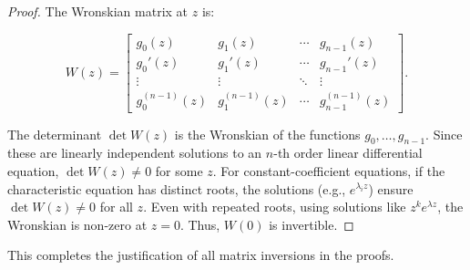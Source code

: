 \documentclass{article}
\begin{document}
	\begin{proof}
		The Wronskian matrix at \(z\) is:
		
		\begin{equation}
			W(z) = \begin{bmatrix}
				g_0(z) & g_1(z) & \cdots & g_{n-1}(z) \\
				g_0'(z) & g_1'(z) & \cdots & g_{n-1}'(z) \\
				\vdots & \vdots & \ddots & \vdots \\
				g_0^{(n-1)}(z) & g_1^{(n-1)}(z) & \cdots & g_{n-1}^{(n-1)}(z)
			\end{bmatrix}.
		\end{equation}
		
		The determinant \(\det W(z)\) is the Wronskian of the functions \(g_0, \ldots, g_{n-1}\). Since these are linearly independent solutions to an \(n\)-th order linear differential equation, \(\det W(z) \neq 0\) for some \(z\). For constant-coefficient equations, if the characteristic equation has distinct roots, the solutions (e.g., \(e^{\lambda_i z}\)) ensure \(\det W(z) \neq 0\) for all \(z\). Even with repeated roots, using solutions like \(z^k e^{\lambda z}\), the Wronskian is non-zero at \(z = 0\). Thus, \(W(0)\) is invertible.
	\end{proof}
	
	This completes the justification of all matrix inversions in the proofs.
	
\end{document}
